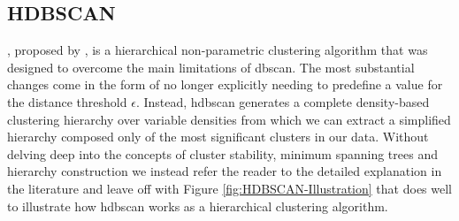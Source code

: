 \subsection{HDBSCAN}
\label{subsec:Background-Information:HDBSCAN}
, proposed by \citet{Campello}, is a hierarchical non-parametric clustering algorithm that was designed to overcome the main limitations of \gls{dbscan}. The most substantial changes come in the form of no longer explicitly needing to predefine a value for the distance threshold $\epsilon$. Instead, \gls{hdbscan} generates a complete density-based clustering hierarchy over variable densities from which we can extract a simplified hierarchy composed only of the most significant clusters in our data. Without delving deep into the concepts of cluster stability, minimum spanning trees and hierarchy construction we instead refer the reader to the detailed explanation in the literature \cite{Campello} and leave off with Figure \ref{fig:HDBSCAN-Illustration} that does well to illustrate how \gls{hdbscan} works as a hierarchical clustering algorithm.

